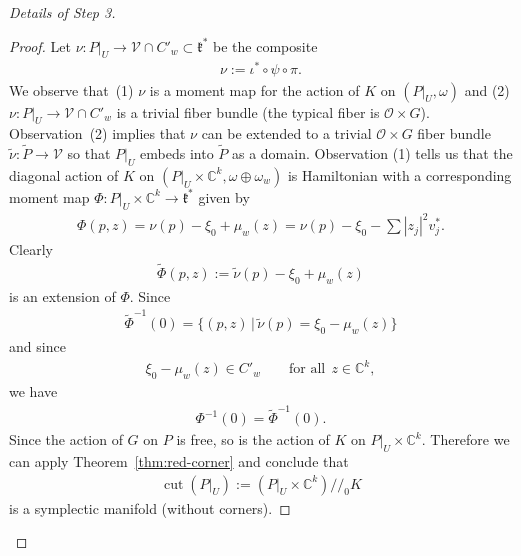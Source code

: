 \documentclass[10pt,a4paper]{amsart}
\numberwithin{equation}{section}
\begin{document}
\begin{proof}[Details of Step 3]
\begin{proof}
Let $\nu\colon P|_U\to {\mathcal V}\cap C'_w \subset {\mathfrak k}^*$ be the composite
\begin{gather*}
\nu:= \iota^*\circ \psi \circ \pi.
\end{gather*}
We observe that~(1) $\nu$ is a moment map for the action of $K$ on
$(P|_U, \omega)$ and (2) $\nu\colon P|_U\to {\mathcal V}\cap C'_w$ is a trivial
f\/iber bundle (the typical f\/iber is ${\mathcal O}\times G$). Observation~(2)
implies that $\nu$ can be extended to a trivial ${\mathcal O}\times G$ f\/iber
bundle $\tilde{\nu}\colon \tilde{P} \to {\mathcal V}$ so that $P|_U$ embeds into
$\tilde{P}$ as a domain.  Observation (1) tells us that the diagonal
action of $K$ on $(P|_U\times {\mathbb C}^k, \omega\oplus \omega_w)$ is
Hamiltonian with a corresponding moment map
$\Phi \colon  P|_U \times {\mathbb C}^k \to {\mathfrak k}^*$ given by
\begin{gather*}
\Phi(p,z) = \nu(p) -\xi_0+ \mu_w (z) = \nu(p) -\xi_0 -\sum |z_j|^2 v_j^*.
\end{gather*}
Clearly
\begin{gather*}
\tilde{\Phi}(p,z) := \tilde{\nu}(p) -\xi_0 + \mu_w (z)
\end{gather*}
is an extension of $\Phi$. Since
\begin{gather*}
\tilde{\Phi}^{-1} (0) = \{(p,z)\,|\, \tilde{\nu}(p) = \xi_0-\mu_w(z)\}
\end{gather*}
and since
\begin{gather*}
\xi_0-\mu_w(z)\in C'_w \qquad \textrm{for all} \ \ z\in {\mathbb C}^k,
\end{gather*}
we have
\begin{gather*}
\Phi^{-1} (0) = \tilde{\Phi}^{-1} (0).
\end{gather*}
Since the action of $G$ on $P$ is free, so is the action of $K$ on
$P|_U\times {\mathbb C}^k$.  Therefore we can apply
Theorem~\ref{thm:red-corner} and conclude that
\begin{gather*}
\operatorname{cut}(P|_U):= (P|_U\times {\mathbb C}^k)/\!/_0 K
\end{gather*}
is a symplectic manifold (without corners).


\end{proof}
\end{proof}
\end{document}
